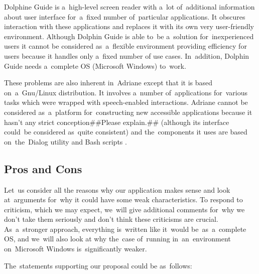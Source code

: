 \documentclass{acm_proc_article-sp}
\begin{document}
Dolphine Guide is a~high-level screen reader with a~lot of~additional information about user interface 
for~a~fixed number of~particular applications.
It obscures interaction with these applications and replaces it with its own 
very user-friendly environment.
Although Dolphin Guide is able to~be a~solution for~inexperienced users 
it cannot be considered as~a~flexible environment providing efficiency for users 
because it handles only a~fixed number of use cases.
In~addition, Dolphin Guide needs a~complete OS (Microsoft Windows) to~work.

These problems are also inherent in~Adriane except 
that it is based on~a~Gnu/Linux distribution.
It involves a~number of~applications for~various tasks 
which were wrapped with speech-enabled interactions.
Adriane cannot be considered as~a~platform for~constructing new accessible applications 
because it hasn't any strict conception##Please explain.## (although its interface could~be considered as~quite consistent)
and the~components it uses are based on~the~Dialog \cite{dialog} utility and Bash scripts \cite{bash}.

\subsection{Pros and Cons}

Let~us consider all the reasons why our application makes sense and look at~arguments for~why  it could have some weak characteristics.
To respond to criticism, which we may expect, 
we~will give additional comments for~why we don't take them seriously and don't think these criticisms are crucial. 
As~a~stronger approach, everything is~written 
like it~would be~as~a~complete OS, and we~will also look at why
the~case of~running in~an~environment on~Microsoft Windows 
is~significantly weaker. 

The~statements supporting  our proposal  could be as~follows: 
\end{document}
